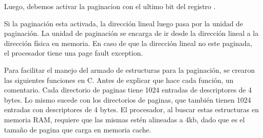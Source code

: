 Luego, debemos activar la paginacion con el ultimo bit del registro .

Si la paginación esta activada, la dirección lineal luego pasa por la unidad de paginación. La unidad de paginación se encarga de ir desde la dirección lineal a la dirección física en memoria. En caso de que la dirección lineal no este paginada, el procesador tiene una page fault exception.

Para facilitar el manejo del armado de estructuras para la paginación, se crearon las siguientes funciones en C. Antes de explicar que hace cada función, un comentario. Cada directorio de paginas tiene 1024 entradas de descriptores de 4 bytes. Lo mismo sucede con los directorios de paginas, que también tienen 1024 entradas con descriptores de 4 bytes. El procesador, al buscar estas estructuras en memoria RAM, requiere que las mismas estén alineadas a 4kb, dado que es el tamaño de pagina que carga en memoria cache.

